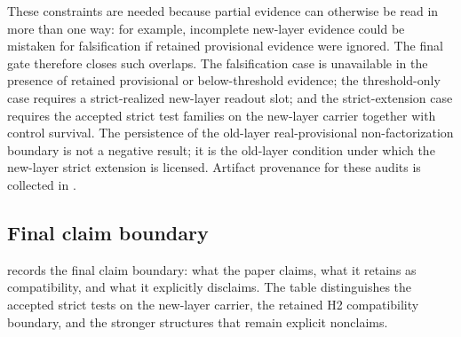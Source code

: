 \documentclass[11pt]{article}
\newcommand{\OldLayer}{H2}
\theoremstyle{definition}
\begin{document}
These constraints are needed because partial evidence can otherwise be read in
more than one way: for example, incomplete new-layer evidence could be mistaken
for falsification if retained provisional evidence were ignored.  The final gate
therefore closes such overlaps.  The falsification case is unavailable in the
presence of retained provisional or below-threshold evidence; the threshold-only
case requires a strict-realized new-layer readout slot; and the strict-extension
case requires the accepted strict test families on the new-layer carrier
together with control survival.  The persistence of the old-layer
real-provisional non-factorization boundary is not a negative result; it is the
old-layer condition under which the new-layer strict extension is licensed.
Artifact provenance for these audits is collected in .

\subsection{Final claim boundary}\label{subsec:final-claim-boundary}

 records the final claim boundary: what the paper
claims, what it retains as compatibility, and what it explicitly disclaims.  The
table distinguishes the accepted strict tests on the new-layer carrier, the
retained \OldLayer{} compatibility boundary, and the stronger structures that
remain explicit nonclaims.
\end{document}
